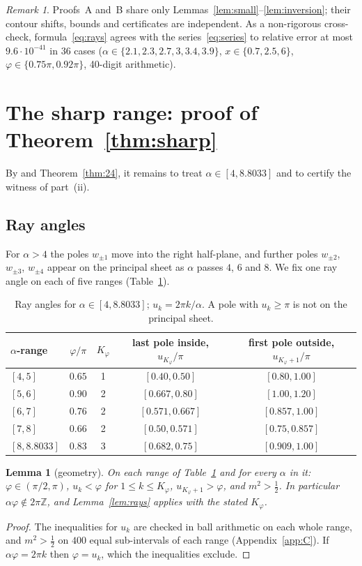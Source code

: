 \documentclass[11pt,a4paper]{article}
\theoremstyle{plain}
\newtheorem{lemma}[theorem]{Lemma}
\theoremstyle{remark}
\newtheorem*{remark}{Remark}
\newcommand{\Z}{\mathbb Z}
\begin{document}
\begin{remark}
Proofs~A and~B share only Lemmas~\ref{lem:small}--\ref{lem:inversion}; their contour shifts,
bounds and certificates are independent. As a non-rigorous cross-check, formula~\eqref{eq:rays}
agrees with the series~\eqref{eq:series} to relative error at most $9.6\cdot10^{-41}$ in $36$ cases
($\alpha\in\{2.1,2.3,2.7,3,3.4,3.9\}$, $x\in\{0.7,2.5,6\}$, $\varphi\in\{0.75\pi,0.92\pi\}$,
40-digit arithmetic).
\end{remark}

\section{The sharp range: proof of Theorem~\ref{thm:sharp}}\label{sec:sharp}
By \cite[Theorem~A]{FS} and Theorem~\ref{thm:24}, it remains to treat $\alpha\in[4,8.8033]$ and to
certify the witness of part~(ii).

\subsection{Ray angles}
For $\alpha>4$ the poles $w_{\pm1}$ move into the right half-plane, and further poles $w_{\pm2}$,
$w_{\pm3}$, $w_{\pm4}$ appear on the principal sheet as $\alpha$ passes $4$, $6$ and $8$. We fix one
ray angle on each of five ranges (Table~\ref{tab:rays}).

\begin{table}[ht]\centering\small
\begin{tabular}{lcccc}
\toprule
$\alpha$-range & $\varphi/\pi$ & $K_\varphi$ & last pole inside, $u_{K_\varphi}/\pi$ &
 first pole outside, $u_{K_\varphi+1}/\pi$\\
\midrule
$[4,5]$ & $0.65$ & 1 & $[0.40,0.50]$ & $[0.80,1.00]$\\
$[5,6]$ & $0.90$ & 2 & $[0.667,0.80]$ & $[1.00,1.20]$\\
$[6,7]$ & $0.76$ & 2 & $[0.571,0.667]$ & $[0.857,1.00]$\\
$[7,8]$ & $0.66$ & 2 & $[0.50,0.571]$ & $[0.75,0.857]$\\
$[8,8.8033]$ & $0.83$ & 3 & $[0.682,0.75]$ & $[0.909,1.00]$\\
\bottomrule
\end{tabular}
\caption{Ray angles for $\alpha\in[4,8.8033]$; $u_k=2\pi k/\alpha$. A pole with $u_k\ge\pi$ is not
on the principal sheet.}\label{tab:rays}
\end{table}

\begin{lemma}[geometry]\label{lem:geom}
On each range of Table~\ref{tab:rays} and for every $\alpha$ in it: $\varphi\in(\pi/2,\pi)$,
$u_k<\varphi$ for $1\le k\le K_\varphi$, $u_{K_\varphi+1}>\varphi$, and $m^2>\frac12$. In
particular $\alpha\varphi\notin2\pi\Z$, and Lemma~\ref{lem:rays} applies with the stated
$K_\varphi$.
\end{lemma}
\begin{proof}
The inequalities for $u_k$ are checked in ball arithmetic on each whole range, and $m^2>\frac12$
on $400$ equal sub-intervals of each range (Appendix~\ref{app:C}). If $\alpha\varphi=2\pi k$ then
$\varphi=u_k$, which the inequalities exclude.
\end{proof}
\end{document}
